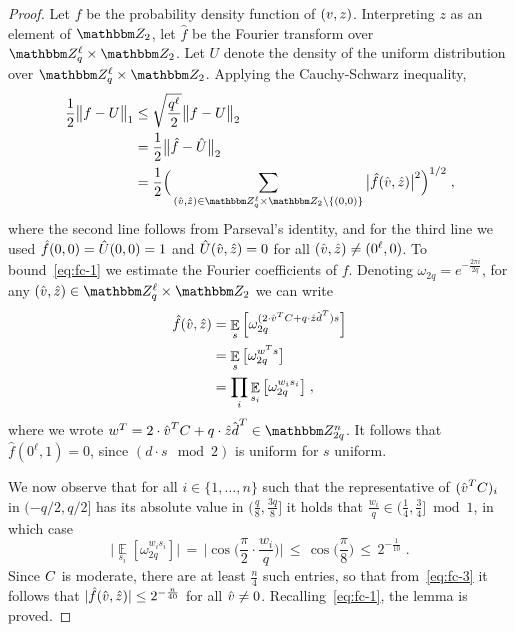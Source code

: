 \begin{proof}
Let $f$ be the probability density function of $(\*v,z)$. Interpreting $z$ as an element of $\mZ_2$, let $\hat{f}$ be the Fourier transform over $\mZ_q^{\ell}\times \mZ_2$. Let $U$ denote the density of the uniform distribution over $\mZ_q^{\ell}\times \mZ_2$. Applying the Cauchy-Schwarz inequality,
\begin{align}
\frac{1}{2}\big\| f - U \big \|_1 &\leq \sqrt{\frac{q^\ell}{2}} \big\| {f} - {U} \big\|_2 \notag \\
&= \frac{1}{2} \big\| \hat{f} - \hat{U} \big\|_2 \notag \\
&= \frac{1}{2} \Big( \sum_{(\hat{\*v},\hat{z})\in \mZ_q^\ell \times \mZ_2\backslash\{(\*0,0)\}} \big| \hat{f}(\hat{\*v},\hat{z})\big|^2\Big)^{1/2}\;,\label{eq:fc-1}
\end{align}
where the second line follows from Parseval's identity, and for the third line we used $\hat{f}(\*0,0)=\hat{U}(0,0)=1$ and $\hat{U}(\hat{\*v},\hat{z})=0$ for all $(\hat{\*v},\hat{z})\neq(0^\ell,0)$. To bound~\eqref{eq:fc-1} we estimate the Fourier coefficients of $f$. Denoting $\omega_{2q} = e^{-\frac{2\pi i}{2q}}$, for any $(\hat{\*v},\hat{z}) \in \mZ_q^\ell \times \mZ_2$ we can write 
\begin{align}
\hat{f}({\hat{\*v}},{\hat{z}}) &= \mathop{\mathbb{E}}\limits_{\*s}\Big[\omega_{2q}^{(2\cdot {\hat{\*v}}^TC + q\cdot {\hat{z}}\hat{\*d}^T)\*s}\Big]\notag\\
&= \mathop{\mathbb{E}}\limits_{\*s}\big[\omega_{2q}^{\*w^T\*s}\big] \notag\\
&= \prod_i\mathop{\mathbb{E}}\limits_{s_i}\big[\omega_{2q}^{w_is_i}\big]\;,\label{eq:fc-3}
\end{align}
where we wrote $\*w^T = 2\cdot {\hat{\*v}}^T\*C + q\cdot {\hat{z}}\hat{\*d}^T\in \mZ_{2q}^n$. It follows that $\hat{f}(0^\ell,1)=0$, since $(d\cdot s \mod 2)$ is uniform for $s$ uniform.  

We now observe that for all $i\in\{1,\ldots,n\}$ such that the representative of $({\hat{\*v}}^T\*C)_i$ in $(-q/2,q/2]$ has its absolute value in $(\frac{q}{8},\frac{3q}{8}]$ it holds that $\frac{w_i}{q}\in (\frac{1}{4},\frac{3}{4}]\bmod 1$, in which case
\begin{equation}
\big|\mathop{\mathbb{E}}\limits_{s_i}[\omega_{2q}^{w_is_i}]\big| \,=\, \Big|\cos\Big(\frac{\pi}{2}\cdot \frac{w_i}{q}\Big)\Big| \,\leq\, \cos\Big(\frac{\pi}{8}\Big)\,\leq\, 2^{-\frac{1}{10}}\;.
\end{equation}
Since $\*C$ is moderate, there are at least $\frac{n}{4}$ such entries, so that from~\eqref{eq:fc-3} it follows that $|\hat{f}({\hat{\*v}},{\hat{z}})|\leq 2^{-\frac{n}{40}}$ for all $\hat{\*v} \neq \*0$. Recalling~\eqref{eq:fc-1}, the lemma is proved.  
\end{proof}


